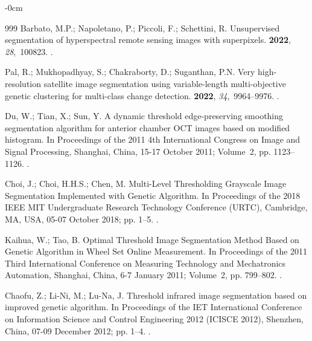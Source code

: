 \documentclass[analytics,article,accept,pdftex,moreauthors]{Definitions/mdpi}
\begin{document}
\begin{adjustwidth}{-\extralength}{0cm}
\begin{thebibliography}{999}
Barbato, M.P.; Napoletano, P.; Piccoli, F.; Schettini, R.
\newblock Unsupervised segmentation of hyperspectral remote sensing images with
  superpixels.
 {\bf
  2022}, {\em 28},~100823.
.

Pal, R.; Mukhopadhyay, S.; Chakraborty, D.; Suganthan, P.N.
\newblock Very high-resolution satellite image segmentation using
  variable-length multi-objective genetic clustering for multi-class change
  detection.
 {\bf 2022}, {\em 34},~9964--9976.
.

Du, W.; Tian, X.; Sun, Y.
\newblock A dynamic threshold edge-preserving smoothing segmentation algorithm
  for anterior chamber OCT images based on modified histogram.
\newblock In Proceedings of the 2011 4th International Congress on Image and
  Signal Processing, Shanghai, China, 15-17 October 2011; Volume~2, pp. 1123--1126.
.

Choi, J.; Choi, H.H.S.; Chen, M.
\newblock Multi-Level Thresholding Grayscale Image Segmentation Implemented
  with Genetic Algorithm.
\newblock In Proceedings of the 2018 IEEE MIT Undergraduate Research Technology
  Conference (URTC), Cambridge, MA, USA, 05-07 October 2018; pp. 1--5.
.

Kaihua, W.; Tao, B.
\newblock Optimal Threshold Image Segmentation Method Based on Genetic
  Algorithm in Wheel Set Online Measurement.
\newblock In Proceedings of the 2011 Third International Conference on
  Measuring Technology and Mechatronics Automation, Shanghai, China, 6-7 January 2011; Volume~2, pp.
  799--802.
.

Chaofu, Z.; Li-Ni, M.; Lu-Na, J.
\newblock Threshold infrared image segmentation based on improved genetic
  algorithm.
\newblock In Proceedings of the IET International Conference on Information
  Science and Control Engineering 2012 (ICISCE 2012), Shenzhen, China, 07-09 December 2012; pp. 1--4.
.


\end{thebibliography}
\end{adjustwidth}
\end{document}
